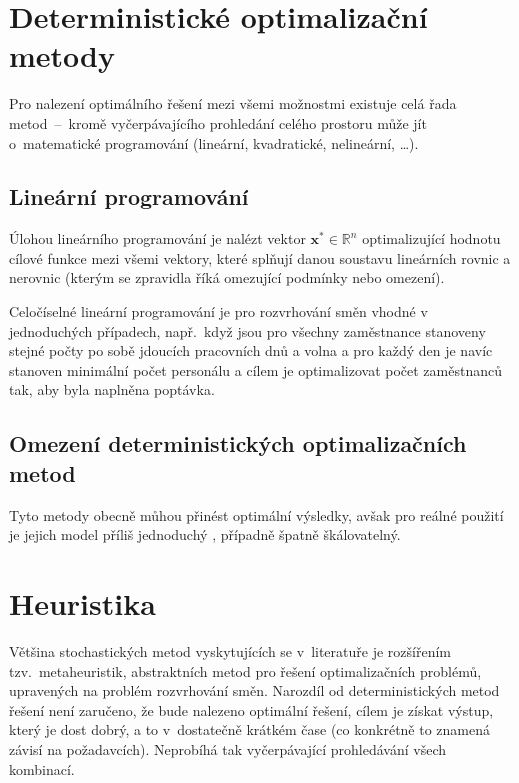 \documentclass[twoside]{ctuthesis}
\begin{document}
\section{Deterministické optimalizační metody}

Pro nalezení optimálního řešení mezi všemi možnostmi existuje celá řada metod~–~kromě vyčerpávajícího prohledání celého prostoru může jít o~matematické programování (lineární, kvadratické, nelineární, …).

\subsection{Lineární programování}

Úlohou lineárního programování je nalézt vektor $\boldsymbol{x}^{\ast} \in \mathbb{R}^n$ optimalizující hodnotu cílové funkce mezi všemi vektory, které splňují danou soustavu lineárních rovnic a nerovnic (kterým se zpravidla říká omezující podmínky nebo omezení). \cite{matousek2006linearni}

Celočíselné lineární programování je pro rozvrhování směn vhodné v jed\-no\-du\-chých případech, např.~když jsou pro všechny zaměstnance stanoveny stejné počty po sobě jdoucích pracovních dnů a volna a pro každý den je navíc stanoven minimální počet personálu a cílem je optimalizovat počet zaměstnanců tak, aby byla naplněna poptávka. \cite{satheeshkumar2014linear}

\subsection{Omezení deterministických optimalizačních metod}
Tyto metody obecně můhou přinést optimální výsledky, avšak pro reálné použití je jejich model příliš jednoduchý \cite{burke2004state}, případně špatně škálovatelný.

\section{Heuristika}

Většina stochastických metod vyskytujících se v~literatuře je rozšířením tzv.~metaheuristik, abstraktních metod pro řešení optimalizačních problémů, upravených na problém rozvrhování směn. Narozdíl od deterministických metod řešení není zaručeno, že bude nalezeno optimální řešení, cílem je získat výstup, který je dost dobrý, a to v~dostatečně krátkém čase (co konkrétně to znamená závisí na požadavcích). Neprobíhá tak vyčerpávající prohledávání všech kombinací. \cite{glover2015metaheuristics}
\end{document}
